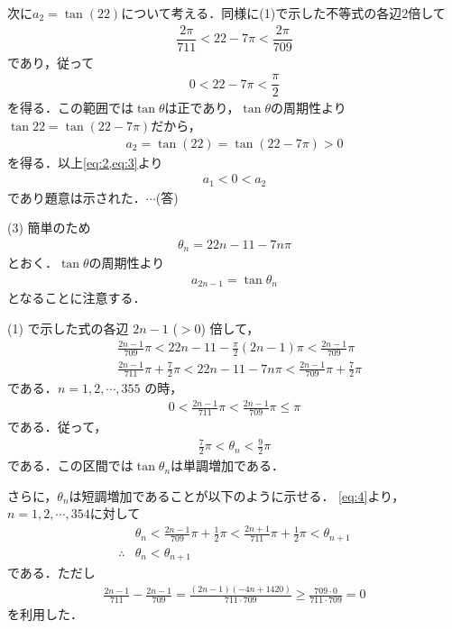 \documentclass[a4paper,10pt]{ltjsarticle}
\begin{document}
\begin{multicols}{2}
  次に$a_2=\tan(22)$について考える．同様に(1)で示した不等式の各辺$2$倍して
  \begin{align*}
    \dfrac{2\pi}{711} < 22 - 7\pi < \dfrac{2\pi}{709}
  \end{align*}
  であり，従って
  \begin{align*}
    0 < 22 - 7\pi < \dfrac{\pi}{2}
  \end{align*}
  を得る．この範囲では$\tan\theta$は正であり，$\tan\theta$の周期性より$\tan 22 = \tan (22-7\pi)$だから，
  \begin{align}
    a_2 = \tan(22) = \tan\left(22-7\pi\right) > 0 \label{eq:3}
  \end{align}
  を得る．以上\cref{eq:2,eq:3}より
  \begin{align*}
    a_1 < 0 < a_2
  \end{align*}
  であり題意は示された．$\cdots$(答)

  \vspace{10pt}
  (3)
  簡単のため
  \begin{align*}
    \theta_n = 22n-11-7n\pi
  \end{align*}
  とおく．$\tan\theta$の周期性より
  \begin{align}
    a_{2n-1} = \tan\theta_n \label{eq:6}
  \end{align}
  となることに注意する．

  (1) で示した式の各辺 $2n-1$ ($>0$) 倍して，
  \begin{align}
     & \frac{2n-1}{709}\pi < 22n-11 - \frac{\pi}{2}(2n-1)\pi < \frac{2n-1}{709}\pi  \nonumber                    \\
     & \frac{2n-1}{711}\pi + \frac{7}{2}\pi < 22n-11 - 7n\pi < \frac{2n-1}{709}\pi + \frac{7}{2}\pi \label{eq:4}
  \end{align}
  である．$n=1,2,\cdots,355$ の時，
  \begin{align*}
    0 < \frac{2n-1}{711}\pi < \frac{2n-1}{709}\pi \le \pi
  \end{align*}
  である．従って，
  \begin{align*}
    \frac{7}{2}\pi<\theta_n<\frac{9}{2}\pi
  \end{align*}
  である．この区間では$\tan\theta_n$は単調増加である．

  さらに，$\theta_n$は短調増加であることが以下のように示せる．
  \cref{eq:4}より，$n=1,2,\cdots,354$に対して
  \begin{align}
     & \theta_n < \frac{2n-1}{709}\pi + \frac{1}{2}\pi < \frac{2n+1}{711}\pi + \frac{1}{2}\pi < \theta_{n+1} \nonumber \\
    \therefore
     & \theta_n < \theta_{n+1} \label{eq:5}
  \end{align}
  である．ただし
  \begin{align*}
    \frac{2n-1}{711} - \frac{2n-1}{709} = \frac{(2n-1)(-4n+1420)}{711 \cdot 709} \ge \frac{709 \cdot 0}{711 \cdot 709} = 0
  \end{align*}
  を利用した．


\end{multicols}
\end{document}
